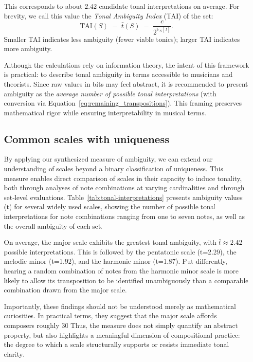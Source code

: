 \documentclass[10pt,twocolumn]{article}
\numberwithin{equation}{section} %
\begin{document}
    

    This corresponds to about $2.42$ candidate tonal interpretations on average.
    For brevity, we call this value the \emph{Tonal Ambiguity Index} (TAI) of the set:
    \[
        \mathrm{TAI}(S) \;=\; \bar{t}(S) \;=\; \frac{c}{2^{\mathbb{E}_S[I]}}.
    \]
    Smaller TAI indicates less ambiguity (fewer viable tonics); larger TAI indicates more ambiguity.

    Although the calculations rely on information theory, the intent of this framework is practical: to describe tonal ambiguity in terms accessible to musicians and theorists.
    Since raw values in bits may feel abstract, it is recommended to present ambiguity as the \textit{average number of possible tonal interpretations} (with conversion via Equation~\ref{eq:remaining_transpositions}).
    This framing preserves mathematical rigor while ensuring interpretability in musical terms.

    \subsection{Common scales with uniqueness}

    By applying our synthesized measure of ambiguity, we can extend our understanding of scales beyond a binary classification of uniqueness.
    This measure enables direct comparison of scales in their capacity to induce tonality, both through analyses of note combinations at varying cardinalities and through set‑level evaluations.
    Table~\ref{tab:tonal-interpretations} presents ambiguity values (t) for several widely used scales, showing the number of possible tonal interpretations for note combinations ranging from one to seven notes, as well as the overall ambiguity of each set.

    On average, the major scale exhibits the greatest tonal ambiguity, with $\bar{t}\approx 2.42$ possible interpretations.
    This is followed by the pentatonic scale (t=2.29), the melodic minor (t=1.92), and the harmonic minor (t=1.87).
    Put differently, hearing a random combination of notes from the harmonic minor scale is more likely to allow its transposition to be identified unambiguously than a comparable combination drawn from the major scale.

    Importantly, these findings should not be understood merely as mathematical curiosities.
    In practical terms, they suggest that the major scale affords composers roughly 30%
    Thus, the measure does not simply quantify an abstract property, but also highlights a meaningful dimension of compositional practice: the degree to which a scale structurally supports or resists immediate tonal clarity.
\end{document}
